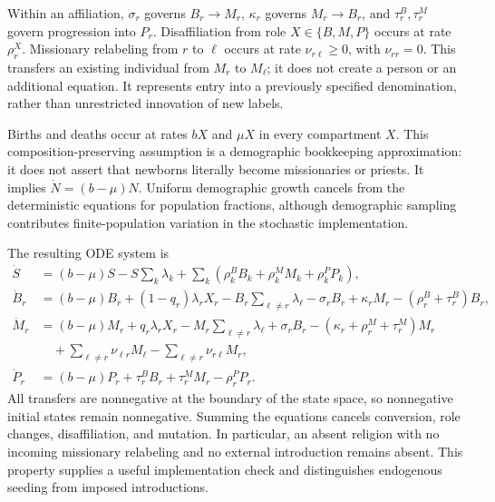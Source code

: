 Within an affiliation, $\sigma_r$ governs $B_r\to M_r$, $\kappa_r$ governs $M_r\to B_r$, and $\tau_r^B,\tau_r^M$ govern progression into $P_r$. Disaffiliation from role $X\in\{B,M,P\}$ occurs at rate $\rho_r^X$. Missionary relabeling from $r$ to $\ell$ occurs at rate $\nu_{r\ell}\geq0$, with $\nu_{rr}=0$. This transfers an existing individual from $M_r$ to $M_\ell$; it does not create a person or an additional equation. It represents entry into a previously specified denomination, rather than unrestricted innovation of new labels.

Births and deaths occur at rates $bX$ and $\mu X$ in every compartment $X$. This composition-preserving assumption is a demographic bookkeeping approximation: it does not assert that newborns literally become missionaries or priests. It implies $\dot N=(b-\mu)N$. Uniform demographic growth cancels from the deterministic equations for population fractions, although demographic sampling contributes finite-population variation in the stochastic implementation.

The resulting ODE system is
\begin{align}
\dot S&=(b-\mu)S-S\sum_k\lambda_k+
 \sum_k(\rho_k^BB_k+\rho_k^MM_k+\rho_k^PP_k),\label{eq:S-dynamics}\\
\dot B_r&=(b-\mu)B_r+(1-q_r)\lambda_r X_r-B_r\sum_{\ell\ne r}\lambda_\ell
 -\sigma_rB_r+\kappa_rM_r-(\rho_r^B+\tau_r^B)B_r,\label{eq:B-dynamics}\\
\dot M_r&=(b-\mu)M_r+q_r\lambda_rX_r-M_r\sum_{\ell\ne r}\lambda_\ell
 +\sigma_rB_r-(\kappa_r+\rho_r^M+\tau_r^M)M_r\nonumber\\
&\quad+\sum_{\ell\ne r}\nu_{\ell r}M_\ell-\sum_{\ell\ne r}\nu_{r\ell}M_r,\label{eq:M-dynamics}\\
\dot P_r&=(b-\mu)P_r+\tau_r^BB_r+\tau_r^MM_r-\rho_r^PP_r.\label{eq:P-dynamics}
\end{align}
All transfers are nonnegative at the boundary of the state space, so nonnegative initial states remain nonnegative. Summing the equations cancels conversion, role changes, disaffiliation, and mutation. In particular, an absent religion with no incoming missionary relabeling and no external introduction remains absent. This property supplies a useful implementation check and distinguishes endogenous seeding from imposed introductions.

